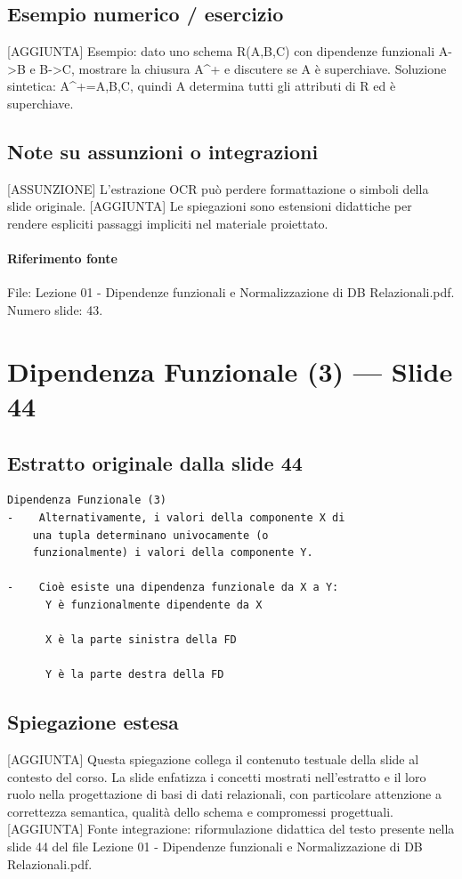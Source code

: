 \documentclass[11pt]{article}
\begin{document}
\subsection*{Esempio numerico / esercizio}
[AGGIUNTA] Esempio: dato uno schema R(A,B,C) con dipendenze funzionali A->B e B->C, mostrare la chiusura A^+ e discutere se A è superchiave. Soluzione sintetica: A^+={A,B,C}, quindi A determina tutti gli attributi di R ed è superchiave.
\subsection*{Note su assunzioni o integrazioni}
[ASSUNZIONE] L'estrazione OCR può perdere formattazione o simboli della slide originale.
[AGGIUNTA] Le spiegazioni sono estensioni didattiche per rendere espliciti passaggi impliciti nel materiale proiettato.
\paragraph{Riferimento fonte} File: Lezione 01 - Dipendenze funzionali e Normalizzazione di DB Relazionali.pdf. Numero slide: 43.
\section{Dipendenza Funzionale (3) --- Slide 44}
\subsection*{Estratto originale dalla slide 44}
\begin{lstlisting}
Dipendenza Funzionale (3)
-    Alternativamente, i valori della componente X di
    una tupla determinano univocamente (o
    funzionalmente) i valori della componente Y.

-    Cioè esiste una dipendenza funzionale da X a Y:
      Y è funzionalmente dipendente da X

      X è la parte sinistra della FD

      Y è la parte destra della FD
\end{lstlisting}
\subsection*{Spiegazione estesa}
[AGGIUNTA] Questa spiegazione collega il contenuto testuale della slide al contesto del corso. La slide enfatizza i concetti mostrati nell'estratto e il loro ruolo nella progettazione di basi di dati relazionali, con particolare attenzione a correttezza semantica, qualità dello schema e compromessi progettuali.
[AGGIUNTA] Fonte integrazione: riformulazione didattica del testo presente nella slide 44 del file Lezione 01 - Dipendenze funzionali e Normalizzazione di DB Relazionali.pdf.
\end{document}
